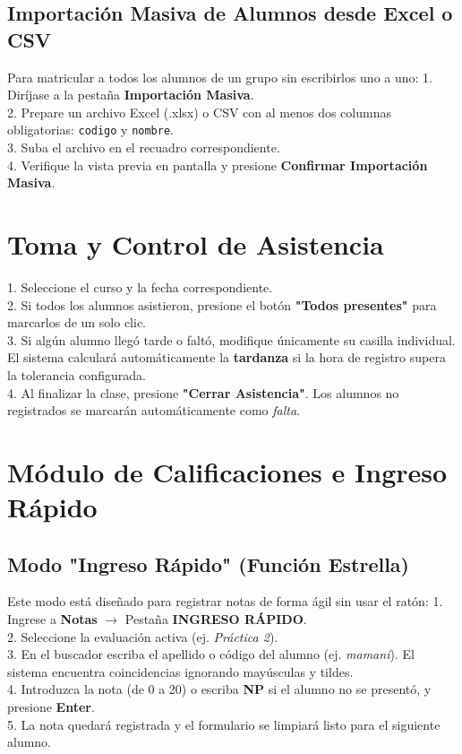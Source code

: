 \documentclass[12pt,a4paper]{article}
\begin{document}
\subsection{Importación Masiva de Alumnos desde Excel o CSV}
Para matricular a todos los alumnos de un grupo sin escribirlos uno a uno:
1. Diríjase a la pestaña \textbf{Importación Masiva}.\\
2. Prepare un archivo Excel (.xlsx) o CSV con al menos dos columnas obligatorias: \texttt{codigo} y \texttt{nombre}.\\
3. Suba el archivo en el recuadro correspondiente.\\
4. Verifique la vista previa en pantalla y presione \textbf{Confirmar Importación Masiva}.

\section{Toma y Control de Asistencia}
1. Seleccione el curso y la fecha correspondiente.\\
2. Si todos los alumnos asistieron, presione el botón \textbf{"Todos presentes"} para marcarlos de un solo clic.\\
3. Si algún alumno llegó tarde o faltó, modifique únicamente su casilla individual. El sistema calculará automáticamente la \textbf{tardanza} si la hora de registro supera la tolerancia configurada.\\
4. Al finalizar la clase, presione \textbf{"Cerrar Asistencia"}. Los alumnos no registrados se marcarán automáticamente como \textit{falta}.

\section{Módulo de Calificaciones e Ingreso Rápido}

\subsection{Modo "Ingreso Rápido" (Función Estrella)}
Este modo está diseñado para registrar notas de forma ágil sin usar el ratón:
1. Ingrese a \textbf{Notas} $\rightarrow$ Pestaña \textbf{INGRESO RÁPIDO}.\\
2. Seleccione la evaluación activa (ej. \textit{Práctica 2}).\\
3. En el buscador escriba el apellido o código del alumno (ej. \textit{mamani}). El sistema encuentra coincidencias ignorando mayúsculas y tildes.\\
4. Introduzca la nota (de 0 a 20) o escriba \textbf{NP} si el alumno no se presentó, y presione \textbf{Enter}.\\
5. La nota quedará registrada y el formulario se limpiará listo para el siguiente alumno.
\end{document}
